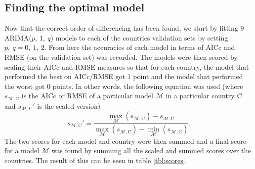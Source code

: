 \documentclass[a4paper, 12pt]{scrartcl}
\begin{document}
\subsection{Finding the optimal model}
Now that the correct order of differencing has been found, we start by fitting 9 ARIMA($p,~1,~q$) models to each of the countries validation sets  by setting $p,~q=0,~1,~2$.
From here the accuracies of each model in terms of AICc and RMSE (on the validation set) was recorded.
The models were then scored by scaling their AICc and RMSE measures so that for each country, the model that performed the best on AICc/RMSE got 1 point and the model that performed the worst got 0 points.
In other words, the following equation was used (where $s_{\mathcal{M},\mathrm{C}}$ is the AICc or RMSE of a particular model $\mathcal{M}$ in a particular country $\mathrm{C}$ and $s_{\mathcal{M},\mathrm{C}}'$ is the scaled version)
\begin{equation*}
	s_{\mathcal{M},\mathrm{C}}'=\frac{\max_\mathcal{M}(s_{\mathcal{M},\mathrm{C}})-s_{\mathcal{M},\mathrm{C}}}{\max_\mathcal{M}(s_{\mathcal{M},\mathrm{C}})-\min_\mathcal{M}(s_{\mathcal{M},\mathrm{C}})}.
\end{equation*}
The two scores for each model and country were then summed and a final score for a model $\mathcal{M}$ was found by summing all the scaled and summed scores over the countries.
The result of this can be seen in table \ref{tbl:scores}.

\newpage
\appendix
\appendixpage
\end{document}
